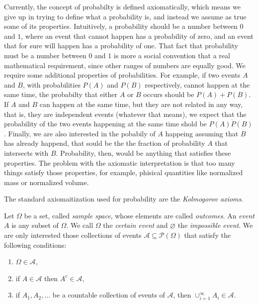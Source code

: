 Currently, the concept of probabilty is defined axiomatically, which means we give up in trying to define what a probability is, and instead we assume as true some of its properties. Intuitively, a probability should be a number between $0$ and $1$, where an event that cannot happen has a probability of zero, and an event that for sure will happen has a probability of one. That fact that probability must be a number between $0$ and $1$ is more a social convention that a real mathematical requirement, since other ranges of numbers are equally good. We require some additional properties of probabilities. For example, if two events $A$ and $B$, with probabilities $P \left( A \right)$ and $P \left( B \right)$ respectively, cannot happen at the same time, the probabilty that either $A$ or $B$ occurs should be $P \left( A \right) + P \left( B \right)$. If $A$ and $B$ can happen at the same time, but they are not related in any way, that is, they are independent events (whatever that means), we expect that the probability of the two events happening at the same time shold be $P \left( A \right) \dot P \left( B \right)$. Finally, we are also interested in the pobabily of $A$ happeing assuming that $B$ has already happend, that sould be the the fraction of probability $A$ that intersects with $B$. Probability, then, would be anything that satisfies these properties. The problem with the axiomatic interpretation is that too many things satisfy those properties, for example, phisical quantities like normalized mass or normalized volume.

The standard axiomaitization used for probability are the \emph{Kolmogorov axioms}.

Let $\Omega$ be a set, called \emph{sample space}, whose elements are called \emph{outcomes}. An \emph{event} $A$ is any subset of $\Omega$. We call $\Omega$ the \emph{certain event} and $\varnothing$ the \emph{impossible event}. We are only interested those collections of events $\mathcal{A} \subseteq \mathcal{P}\left( \Omega \right)$ that satisfy the following conditions:

\begin{enumerate}[label=(\roman*)]
\item $\Omega \in \mathcal{A}$, 
\item if $A \in \mathcal{A}$ then $A^c \in \mathcal{A}$,
\item if $A_1, A_2, \ldots$ be a countable collection of events of $\mathcal{A}$, then $\cup_{i=1}^\infty A_i \in \mathcal{A}$.
\end{enumerate}

